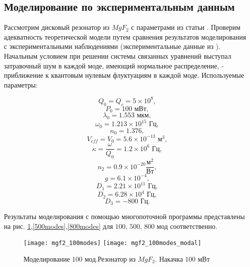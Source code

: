 \subsection{Моделирование по экспериментальным данным}
\label{subsection_experiment}

Рассмотрим дисковый резонатор из $MgF_2$ с параметрами из статьи \cite{Herr2014}. Проверим адекватность теоретической модели путем сравнения результатов моделирования с экспериментальными наблюдениями (экспериментальные данные из \cite{Herr2014}). Начальным условием при решении системы связанных уравнений выступал затравочный шум в каждой моде, имеющий нормальное распределение, - приближение к квантовым нулевым флуктуациям в каждой моде. Используемые параметры:

\begin{equation}
Q_0=Q_c=5\times10^8,
\end{equation}
\begin{equation}
P_0=100\text{ мВт},
\end{equation}
\begin{equation}
\lambda_0=1.553\text{ мкм},
\end{equation}
\begin{equation}
\omega_0=1.213\times10^{15}\text{ Гц},
\end{equation}
\begin{equation}
n_0=1.376,
\end{equation}
\begin{equation}
V_{eff}=V_0=5.6\times10^{-13}\text{ м}^3,
\end{equation}
\begin{equation}
\kappa=\frac{\omega}{Q_0}=1.2\times10^6\text{ Гц},
\end{equation}
\begin{equation}
n_2=0.9\times10^{-20}\frac{\text{м}^2}{\text{Вт}},
\end{equation}
\begin{equation}
g=6.1\times10^{-4},
\end{equation}
\begin{equation}
D_1=2.21\times10^{11}\text{ Гц},
\end{equation}
\begin{equation}
D_2=6.28\times10^4\text{ Гц},
\end{equation}
\begin{equation}
D_3=-800\text{ Гц}.
\end{equation}

Результаты моделирования с помощью многопоточной программы представлены на рис. \ref{100modes},\ref{500modes},\ref{800modes} для $100$, $500$, $800$ мод соответственно.
\begin{figure}
  \texttt{[image: mgf2\_100modes]}
  \texttt{[image: mgf2\_100modes\_modal]}
  \caption{Моделирование 100 мод.Резонатор из $MgF_2$. Накачка $100$ мВт} \label{100modes}
\end{figure}

